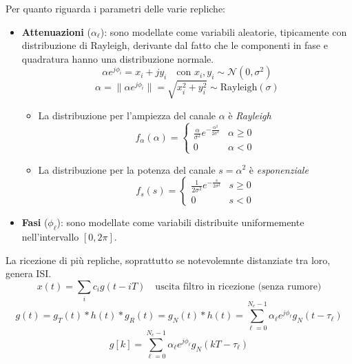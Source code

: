 Per quanto riguarda i parametri delle varie repliche:
\begin{itemize}
    \item \textbf{Attenuazioni} ($\alpha_\ell$): sono modellate come variabili aleatorie, tipicamente con distribuzione di Rayleigh, derivante dal fatto che le componenti in fase e quadratura hanno una distribuzione normale.
          \[
              \alpha e^{j\phi_i} = x_i + j y_i \quad \text{con } x_i, y_i \sim \mathcal{N}(0, \sigma^2)
          \]
          \[
              \alpha = \|\alpha e^{j\phi_i}\| = \sqrt{x_i^2 + y_i^2} \sim \text{Rayleigh}(\sigma)
          \]

          \begin{itemize}
              \item La distribuzione per l'ampiezza del canale \(\alpha\) è \textit{Rayleigh}
                    \[
                        f_{\alpha}(\alpha) =
                        \begin{cases}
                            \frac{\alpha}{\sigma^2} e^{-\frac{\alpha^2}{2\sigma^2}} & \alpha \geq 0 \\
                            0                                                       & \alpha < 0
                        \end{cases}
                    \]

              \item La distribuzione per la potenza del canale \(s = \alpha^2\) è \textit{esponenziale}
                    \[
                        f_s(s) =
                        \begin{cases}
                            \frac{1}{2\sigma^2} e^{-\frac{s}{2\sigma^2}} & s \geq 0 \\
                            0                                            & s < 0
                        \end{cases}
                    \]
          \end{itemize}

    \item \textbf{Fasi} ($\phi_\ell$): sono modellate come variabili distribuite uniformemente nell'intervallo $[0, 2\pi]$.
\end{itemize}

La ricezione di più repliche, soprattutto se notevolemnte distanziate tra loro, genera ISI.
\[
    x(t) = \sum_{i} c_i g(t - iT) \quad \text{uscita filtro in ricezione (senza rumore)}
\]
\[
    g(t) = g_T(t) \ast h(t) \ast g_R(t) = g_N(t) \ast h(t) = \sum_{\ell=0}^{N_c-1} \alpha_{\ell} e^{j\phi_{\ell}} g_N(t - \tau_{\ell})
\]
\[
    g\left[k\right] = \sum_{\ell=0}^{N_c-1} \alpha_{\ell} e^{j\phi_{\ell}} g_N\left(kT - \tau_{\ell}\right)
\]


